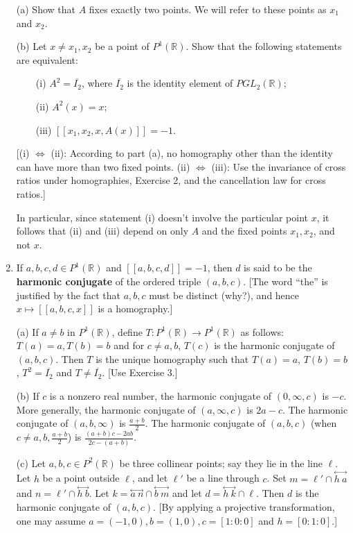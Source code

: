 \documentclass[leqno]{book}
\begin{document}
\begin{enumerate}
(a) Show that $A$ fixes exactly two points.  We will refer to these points as $x_1$ and $x_2$.

(b) Let $x\ne x_1,x_2$ be a point of $P^1(\mathbb R)$.  Show that the following statements are equivalent:

~~~~(i) $A^2=\overline{I_2}$, where $\overline{I_2}$ is the identity element of $PGL_2(\mathbb R)$; %

~~~~(ii) $A^2(x)=x$;

~~~~(iii) $[\![x_1,x_2,x,A(x)]\!]=-1$.

[(i) $\iff$ (ii): According to part (a), no homography other than the identity can have more than two fixed points.  (ii) $\iff$ (iii): Use the invariance of cross ratios under homographies, Exercise 2, and the cancellation law for cross ratios.]

In particular, since statement (i) doesn't involve the particular point $x$, it follows that (ii) and (iii) depend on only $A$ and the fixed points $x_1,x_2$, and not $x$.

\item If $a,b,c,d\in P^1(\mathbb R)$ and $[\![a,b,c,d]\!]=-1$, then $d$ is said to be the \textbf{harmonic conjugate} of the ordered triple $(a,b,c)$.  [The word ``the'' is justified by the fact that $a,b,c$ must be distinct (why?), and hence $x\mapsto[\![a,b,c,x]\!]$ is a homography.]

(a) If $a\ne b$ in $P^1(\mathbb R)$, define $T:P^1(\mathbb R)\to P^1(\mathbb R)$ as follows: $T(a)=a,T(b)=b$ and for $c\ne a,b$, $T(c)$ is the harmonic conjugate of $(a,b,c)$.  Then $T$ is the unique homography such that $T(a)=a$, $T(b)=b$, $T^2=\overline{I_2}$ and $T\ne\overline{I_2}$.  [Use Exercise 3.]

(b) If $c$ is a nonzero real number, the harmonic conjugate of $(0,\infty,c)$ is $-c$.  More generally, the harmonic conjugate of $(a,\infty,c)$ is $2a-c$.  The harmonic conjugate of $(a,b,\infty)$ is $\frac{a+b}2$.  The harmonic conjugate of $(a,b,c)$ (when $c\ne a,b,\frac{a+b}2$) is $\frac{(a+b)c-2ab}{2c-(a+b)}$.

(c) Let $a,b,c\in P^2(\mathbb R)$ be three collinear points; say they lie in the line $\ell$.  Let $h$ be a point outside $\ell$, and let $\ell'$ be a line through $c$.  Set $m=\ell'\cap\overset{\longleftrightarrow}{h~a}$ and $n=\ell'\cap\overset{\longleftrightarrow}{h~b}$.  Let $k=\overset{\longleftrightarrow}{a~n}\cap\overset{\longleftrightarrow}{b~m}$ and let $d=\overset{\longleftrightarrow}{h~k}\cap\ell$.  Then $d$ is the harmonic conjugate of $(a,b,c)$.  [By applying a projective transformation, one may assume $a=(-1,0),b=(1,0),c=[1:0:0]$ and $h=[0:1:0]$.]


\end{enumerate}
\end{document}
